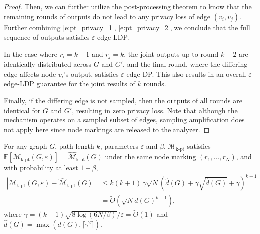 \begin{proof}

Then, we can further utilize the post-processing theorem to know that the remaining rounds of outputs do not lead to any privacy loss of edge $(v_i,v_j)$. Further combining \eqref{e:pt_privacy_1}, \eqref{e:pt_privacy_2}, we conclude that the full sequence of outputs satisfies $\varepsilon$-edge-LDP.  

In the case where $r_i = k-1$ and $r_j = k$, the joint outputs up to round $k-2$ are identically distributed across $G$ and $G'$, and the final round, where the differing edge affects node $v_i$'s output, satisfies $\varepsilon$-edge-DP. 
This also results in an overall $\varepsilon$-edge-LDP guarantee for the joint results of $k$ rounds.

Finally, if the differing edge is not sampled, then the outputs of all rounds are identical for $G$ and $G'$, resulting in zero privacy loss.  
Note that although the mechanism operates on a sampled subset of edges, sampling amplification does not apply here since node markings are released to the analyzer.
\end{proof}


\begin{lemma}
    For any graph $G$, path length $k$, parameters $\varepsilon$ and $\beta$, 
$\mathcal{M}_{\mathrm{k\text{-}pt}}$ satisfies
$
    \mathbb{E}[\mathcal{M}_{\mathrm{k\text{-}pt}}(G, \varepsilon)]
    =  
    \widehat{\mathcal{M}}_{\mathrm{k\text{-}pt}}(G)$
under the same node marking $(r_1, \dots, r_N)$, 
and with probability at least $1 - \beta$,
\begin{align*}
    |\mathcal{M}_{\mathrm{k\text{-}pt}}(G, \varepsilon) - 
    \widehat{\mathcal{M}}_{\mathrm{k\text{-}pt}}(G)| 
    &\leq 
    {k(k+1)} \,
    \gamma
    \sqrt{N}
    (\hat{d}(G) + \gamma \sqrt{\hat{d}(G)} + \gamma)^{k-1} 
    \\
    &=  \tilde{O}(\sqrt{N} d(G)^{k-1}),
\end{align*}
where $\gamma = (k+1)\sqrt{8\log(6N/\beta)}/\varepsilon = \tilde{O}(1) $ and $\hat{d}(G) = \max(d(G), \lceil\gamma^2\rceil)$.
\end{lemma}


